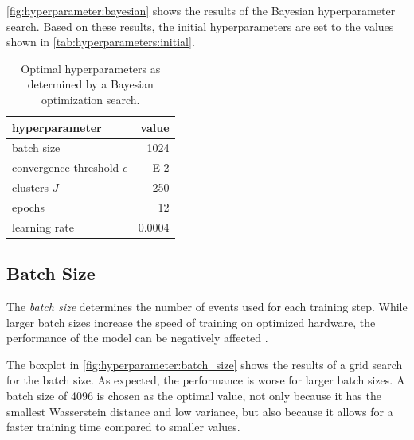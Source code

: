 \autoref{fig:hyperparameter:bayesian} shows the results of the Bayesian hyperparameter search.
Based on these results,
the initial hyperparameters are set to the values shown in \autoref{tab:hyperparameters:initial}.

\begin{table}
    \centering
    \begin{tabular}{l r}
      \toprule
      hyperparameter & {value} \\
      \midrule
        batch size & \num{1024} \\
        convergence threshold $\epsilon$ & \num{E-2} \\
        clusters $J$ & \num{250} \\
        epochs & \num{12} \\
        learning rate & \num{0.0004} \\
        \bottomrule
    \end{tabular}
  \caption{
    Optimal hyperparameters as determined by a Bayesian optimization search.
  }
  \label{tab:hyperparameters:initial}
\end{table}


\FloatBarrier
\clearpage %
\subsection{Batch Size}
The \emph{batch size} determines the number of events used for each training step.
While larger batch sizes increase the speed of training
on optimized hardware,
the performance of the model can be negatively affected \cite{batchsize_kandel}.

The boxplot in \autoref{fig:hyperparameter:batch_size} shows the results of a grid search for the batch size.
As expected, the performance is worse for larger batch sizes.
A batch size of \num{4096} is chosen as the optimal value,
  not only because it has
    the smallest Wasserstein distance
    and low variance,
  but also because it allows for a faster training time
    compared to smaller values.

